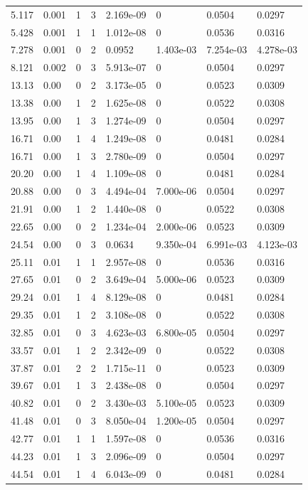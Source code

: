 \documentclass[preview]{standalone}
\begin{document}
{{\begin{tabular}{L{1.2cm}C{1.2cm} C{0.3cm}C{0.5cm} C{1.4cm}C{1.4cm} C{1.4cm}C{1.4cm}}
  5.117  &  0.001  & 1     &  3 &  2.169e-09  & 0  & 0.0504 &  0.0297   \\ 
  5.428  &  0.001  & 1     &  1 &  1.012e-08  & 0  & 0.0536 &  0.0316   \\ 
  7.278  &  0.001  & 0     &  2 &  0.0952  & 1.403e-03  & 7.254e-03 &  4.278e-03   \\ 
  8.121  &  0.002  & 0     &  3 &  5.913e-07  & 0  & 0.0504 &  0.0297   \\ 
  13.13  &  0.00  & 0     &  2 &  3.173e-05  & 0  & 0.0523 &  0.0309   \\ 
  13.38  &  0.00  & 1     &  2 &  1.625e-08  & 0  & 0.0522 &  0.0308   \\ 
  13.95  &  0.00  & 1     &  3 &  1.274e-09  & 0  & 0.0504 &  0.0297   \\ 
  16.71  &  0.00  & 1     &  4 &  1.249e-08  & 0  & 0.0481 &  0.0284   \\ 
  16.71  &  0.00  & 1     &  3 &  2.780e-09  & 0  & 0.0504 &  0.0297   \\ 
  20.20  &  0.00  & 1     &  4 &  1.109e-08  & 0  & 0.0481 &  0.0284   \\ 
  20.88  &  0.00  & 0     &  3 &  4.494e-04  & 7.000e-06  & 0.0504 &  0.0297   \\ 
  21.91  &  0.00  & 1     &  2 &  1.440e-08  & 0  & 0.0522 &  0.0308   \\ 
  22.65  &  0.00  & 0     &  2 &  1.234e-04  & 2.000e-06  & 0.0523 &  0.0309   \\ 
  24.54  &  0.00  & 0     &  3 &  0.0634  & 9.350e-04  & 6.991e-03 &  4.123e-03   \\ 
  25.11  &  0.01  & 1     &  1 &  2.957e-08  & 0  & 0.0536 &  0.0316   \\ 
  27.65  &  0.01  & 0     &  2 &  3.649e-04  & 5.000e-06  & 0.0523 &  0.0309   \\ 
  29.24  &  0.01  & 1     &  4 &  8.129e-08  & 0  & 0.0481 &  0.0284   \\ 
  29.35  &  0.01  & 1     &  2 &  3.108e-08  & 0  & 0.0522 &  0.0308   \\ 
  32.85  &  0.01  & 0     &  3 &  4.623e-03  & 6.800e-05  & 0.0504 &  0.0297   \\ 
  33.57  &  0.01  & 1     &  2 &  2.342e-09  & 0  & 0.0522 &  0.0308   \\ 
  37.87  &  0.01  & 2     &  2 &  1.715e-11  & 0  & 0.0523 &  0.0309   \\ 
  39.67  &  0.01  & 1     &  3 &  2.438e-08  & 0  & 0.0504 &  0.0297   \\ 
  40.82  &  0.01  & 0     &  2 &  3.430e-03  & 5.100e-05  & 0.0523 &  0.0309   \\ 
  41.48  &  0.01  & 0     &  3 &  8.050e-04  & 1.200e-05  & 0.0504 &  0.0297   \\ 
  42.77  &  0.01  & 1     &  1 &  1.597e-08  & 0  & 0.0536 &  0.0316   \\ 
  44.23  &  0.01  & 1     &  3 &  2.096e-09  & 0  & 0.0504 &  0.0297   \\ 
  44.54  &  0.01  & 1     &  4 &  6.043e-09  & 0  & 0.0481 &  0.0284   \\ 
\hline 
\end{tabular} 

}}
\end{document}
